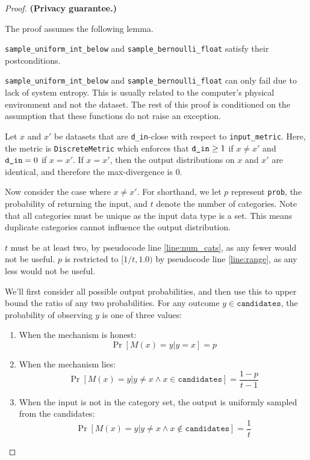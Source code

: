 \documentclass{article}
\begin{document}
\begin{proof}
\textbf{(Privacy guarantee.)}

\begin{tcolorbox}
    The proof assumes the following lemma.
    \begin{lemma}
        \texttt{sample\_uniform\_int\_below} and \texttt{sample\_bernoulli\_float} satisfy their postconditions.
    \end{lemma}
\end{tcolorbox}

\texttt{sample\_uniform\_int\_below} and \texttt{sample\_bernoulli\_float} can only fail due to lack of system entropy.
This is usually related to the computer's physical environment and not the dataset.
The rest of this proof is conditioned on the assumption that these functions do not raise an exception.

Let $x$ and $x'$ be datasets that are \texttt{d\_in}-close with respect to \texttt{input\_metric}.
Here, the metric is \texttt{DiscreteMetric} which enforces that $\texttt{d\_in} \geq 1$ if $x \ne x'$ and $\texttt{d\_in} = 0$ if $x = x'$.
If $x = x'$, then the output distributions on $x$ and $x'$ are identical, and therefore the max-divergence is 0.

Now consider the case where $x \ne x'$.
For shorthand, we let $p$ represent \texttt{prob}, the probability of returning the input,
and $t$ denote the number of categories.
Note that all categories must be unique as the input data type is a set.
This means duplicate categories cannot influence the output distribution.

$t$ must be at least two, by pseudocode line \ref{line:num_cats}, as any fewer would not be useful.
$p$ is restricted to $[1/t, 1.0)$ by pseudocode line \ref{line:range}, as any less would not be useful.

We'll first consider all possible output probabilities,
and then use this to upper bound the ratio of any two probabilities.
For any outcome $y \in \texttt{candidates}$,
the probability of observing $y$ is one of three values:

\begin{enumerate}
    \item When the mechanism is honest:
    \[
        \Pr[M(x) = y | y = x] = p
    \]

    \item When the mechanism lies:
    \[
        \Pr[M(x) = y | y \ne x \wedge x \in \texttt{candidates}] = \frac{1 - p}{t - 1}
    \]

    \item When the input is not in the category set, the output is uniformly sampled from the candidates:
    \[
        \Pr[M(x) = y | y \ne x \wedge x \not\in \texttt{candidates}] = \frac{1}{t}
    \]
\end{enumerate}


\end{proof}
\end{document}
